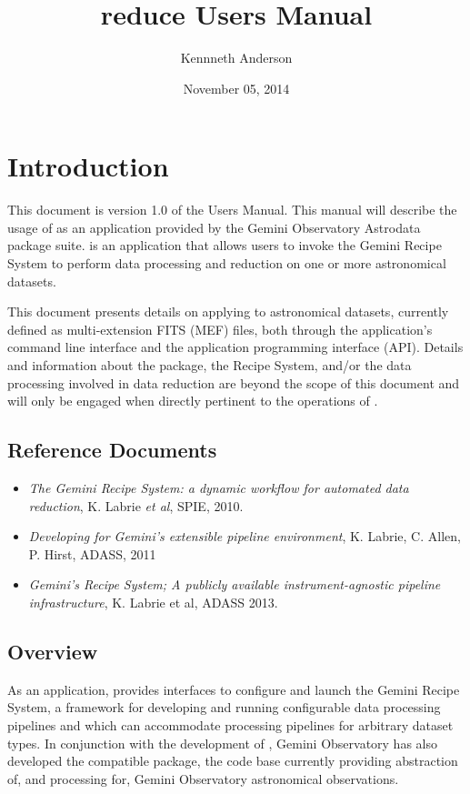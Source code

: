 \documentclass[letterpaper,10pt,english]{sphinxmanual}
\title{reduce Users Manual}
\date{November 05, 2014}
\author{Kennneth Anderson}
\begin{document}
\maketitle
\tableofcontents
{}\label{index-latex::doc}



\chapter{Introduction}
\label{intro:introduction}\label{intro:reduce-users-manual}\label{intro::doc}
This document is version 1.0 of the  Users Manual. This manual will
describe the usage of  as an application provided by the Gemini Observatory
Astrodata package suite.  is an application that allows users to invoke the
Gemini Recipe System to perform data processing and reduction on one or more
astronomical datasets.

This document presents details on applying  to astronomical datasets,
currently defined as multi-extension FITS (MEF) files, both through the application's
command line interface and the application programming interface (API). Details and
information about the  package, the Recipe System, and/or the data
processing involved in data reduction are beyond the scope of this document and
will only be engaged when directly pertinent to the operations of .


\section{Reference Documents}
\label{intro:reference-documents}\begin{itemize}
\item {} 
\emph{The Gemini Recipe System: a dynamic workflow for automated data reduction},
K. Labrie \emph{et al}, SPIE, 2010.

\item {} 
\emph{Developing for Gemini’s extensible pipeline environment}, K. Labrie,
C. Allen, P. Hirst, ADASS, 2011

\item {} 
\emph{Gemini's Recipe System; A publicly available instrument-agnostic pipeline
infrastructure}, K. Labrie et al, ADASS 2013.

\end{itemize}


\section{Overview}
\label{intro:overview}
As an application,  provides interfaces to configure and launch the
Gemini Recipe System, a framework for developing and running configurable data
processing pipelines and which can accommodate processing pipelines for arbitrary
dataset types. In conjunction with the development of , Gemini
Observatory has also developed the compatible  package, the
code base currently providing abstraction of, and processing for, Gemini
Observatory astronomical observations.
\end{document}
